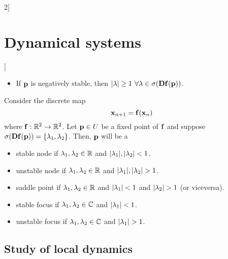 \documentclass[../../../main_math.tex]{subfiles}
\begin{document}
\begin{multicols}{2}[\section{Dynamical systems}]
\begin{proposition}
\begin{itemize}
      \item If $\boldsymbol{\mathrm{p}}$ is negatively stable, then $\abs{\lambda}\geq 1$ $\forall\lambda\in\sigma(\boldsymbol{\mathrm{Df}}(\boldsymbol{\mathrm{p}}))$.
    \end{itemize}
  \end{proposition}
  \begin{theorem}
    Consider the discrete map $$\boldsymbol{\mathrm{x}}_{n+1}=\boldsymbol{\mathrm{f}}(\boldsymbol{\mathrm{x}}_n)$$ where $\boldsymbol{\mathrm{f}}:\mathbb{R}^2\rightarrow\mathbb{R}^2$. Let $\boldsymbol{\mathrm{p}}\in U$ be a fixed point of $\boldsymbol{\mathrm{f}}$ and suppose $\sigma(\boldsymbol{\mathrm{Df}}(\boldsymbol{\mathrm{p}}))=\{\lambda_1,\lambda_2\}$. Then, $\boldsymbol{\mathrm{p}}$ will be a
    \begin{itemize}
      \item {stable node} if $\lambda_1,\lambda_2\in\mathbb{R}$ and $\abs{\lambda_1},\abs{\lambda_2}<1$.
      \item {unstable node} if $\lambda_1,\lambda_2\in\mathbb{R}$ and $\abs{\lambda_1},\abs{\lambda_2}>1$.
      \item {saddle point} if $\lambda_1,\lambda_2\in\mathbb{R}$ and $\abs{\lambda_1}<1$ and $\abs{\lambda_2}>1$ (or viceversa).
      \item {stable focus} if $\lambda_1,\lambda_2\in\mathbb{C}$ and $\abs{\lambda_1}<1$.
      \item {unstable focus} if $\lambda_1,\lambda_2\in\mathbb{C}$ and $\abs{\lambda_1}>1$.
    \end{itemize}
  \end{theorem}
  \subsection{Study of local dynamics}

\end{multicols}
\end{document}
